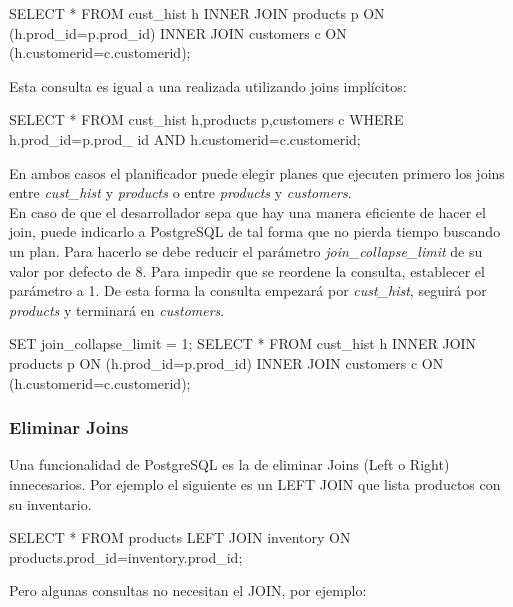 \begin{pyglist}
SELECT * FROM cust_hist h INNER JOIN products p ON (h.prod_id=p.prod_id)
INNER JOIN customers c ON (h.customerid=c.customerid);
\end{pyglist}

Esta consulta es igual a una realizada utilizando joins implícitos:\\

\begin{pyglist}
SELECT * FROM cust_hist h,products p,customers c WHERE h.prod_id=p.prod_
id AND h.customerid=c.customerid;
\end{pyglist}

En ambos casos el planificador puede elegir planes que ejecuten primero los joins entre \textit{cust\_hist} y \textit{products} o entre \textit{products} y \textit{customers}.\\

En caso de que el desarrollador sepa que hay una manera eficiente de hacer el join, puede indicarlo a PostgreSQL de tal forma que no pierda tiempo buscando un plan. Para hacerlo se debe reducir el parámetro \textit{join\_collapse\_limit} de su valor por defecto de 8. Para impedir que se reordene la consulta, establecer el parámetro a 1. De esta forma la consulta empezará por \textit{cust\_hist}, seguirá por \textit{products} y terminará en \textit{customers}. \\

\begin{pyglist}
SET join_collapse_limit = 1;
SELECT * FROM cust_hist h INNER JOIN products p ON (h.prod_id=p.prod_id)
INNER JOIN customers c ON (h.customerid=c.customerid);
\end{pyglist}

\subsubsection{Eliminar Joins}

Una funcionalidad de PostgreSQL es la de eliminar Joins (Left o Right) innecesarios. Por ejemplo el siguiente es un LEFT JOIN que lista productos con su inventario.\\

\begin{pyglist}
SELECT * FROM products LEFT JOIN inventory ON products.prod_id=inventory.prod_id;
\end{pyglist}

Pero algunas consultas no necesitan el JOIN, por ejemplo:\\

